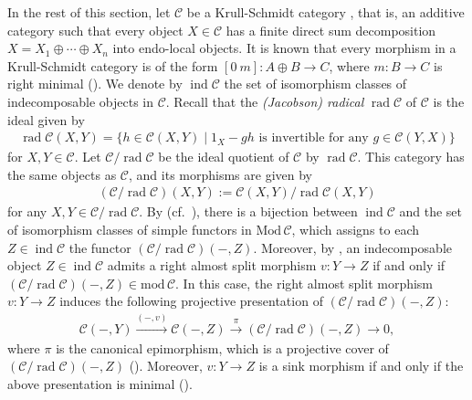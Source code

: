 \documentclass[12pt]{amsart}
\numberwithin{equation}{subsection}
\theoremstyle{plain}
\theoremstyle{definition}
\newcommand{\rad}{\operatorname{rad}}
\renewcommand{\mod}{\mathrm{mod}\,}
\newcommand{\Mod}{\mathrm{Mod}\,}
\newcommand{\ind}{\operatorname{ind}}
\newcommand{\C}{\mathcal{C}}
\begin{document}
In the rest of this section, let $\C$ be a Krull-Schmidt category \cite{Krause_2015}, that is, an additive category such that every object $X \in \C$ has a finite direct sum decomposition $X=X_1  \oplus \cdots \oplus X_n$ into endo-local objects.
It is known that every morphism in a Krull-Schmidt category is of the form $[0\ m]: A \oplus B \to C$, where $m: B \to C$ is right minimal (\cite[Lemma 1]{Rump_2005}).
We denote by $\ind\C$ the set of isomorphism classes of indecomposable objects in $\C$.
Recall that the {\it (Jacobson) radical} $\rad\C$ of $\C$ is the ideal  given by 
\begin{align}
    \rad\C(X, Y) =\{ h \in \C(X, Y) \mid 1_X - gh \text{ is invertible for any } g \in \C(Y, X) \}
\end{align}
for $X, Y\in\C$.
Let $\C/\rad\C$ be the ideal quotient of $\C$ by $\rad\C$.
This category has the same objects as $\C$, and its morphisms are given by 
\begin{align}
    (\C/\rad\C)(X, Y):= \C(X, Y)/\rad\C(X, Y)
\end{align}
for any $X, Y \in \C/\rad\C$.
By \cite[Proposition 2.3]{Auslander_1974_II} (cf.~\cite[Lemma A.5]{Krause_2012}), there is a bijection between $\ind\C$ and the set of isomorphism classes of simple functors in $\Mod\C$, which assigns to each $Z\in\ind\C$ the functor $(\C/\rad\C)(-, Z)$.
Moreover, by \cite[Corollary 2.6]{Auslander_1974_II}, an indecomposable object $Z\in\ind\C$ admits a right almost split morphism $v: Y \to Z$ if and only if $(\C/\rad\C)(-, Z) \in \mod\C$. 
In this case, the right almost split morphism $v: Y \to Z$ induces the following projective presentation of $(\C/\rad\C)(-, Z)$:
\begin{align}
    \C(-,Y) \xrightarrow{(-, v)} \C(-,Z) \xrightarrow{\pi} (\C/\rad\C)(-, Z) \to 0,
\end{align}
where $\pi$ is the canonical epimorphism, which is a projective cover of $(\C/\rad\C)(-, Z)$ (\cite[Lemma A.3]{Krause_2012}).
Moreover, $v: Y \to Z$ is a sink morphism if and only if the above presentation is minimal (\cite[Lemma A.2]{Krause_2012}).
\end{document}
